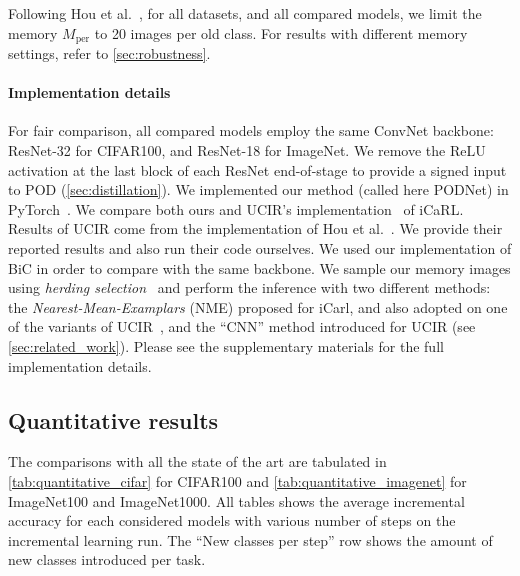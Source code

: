 Following Hou et al.~\citep{hou2019ucir}, for all datasets, and all compared models, we limit the
memory $M_\textrm{per}$ to 20 images per old class. For results with different memory settings,
refer to \autoref{sec:robustness}.

\paragraph{Implementation details} For fair comparison, all compared models employ the same ConvNet
backbone: ResNet-32 for CIFAR100, and ResNet-18 for ImageNet. We remove the ReLU activation at the
last block of each ResNet end-of-stage to provide a signed input to POD
(\autoref{sec:distillation}). We implemented our method (called here PODNet) in
PyTorch~\citep{paszke2017pytorch}.
%
We compare both ours and UCIR's implementation~\citep{hou2019ucir} of iCaRL. Results of UCIR come
from the implementation of Hou et al.~\citep{hou2019ucir}. We provide their reported results and
also run their code ourselves. We used our implementation of BiC in order to compare with the same
backbone.
%
We sample our memory images using \textit{herding selection}~\citep{rebuffi2017icarl} and perform
the inference with two different methods: the \textit{Nearest-Mean-Examplars} (NME) proposed for
iCarl, and also adopted on one of the variants of UCIR~\citep{hou2019ucir}, and the ``CNN'' method
introduced for UCIR (see \autoref{sec:related_work}).
%
Please see the supplementary materials for the full implementation details.



\subsection{Quantitative results}
\label{sec:quantitative_results}

The comparisons with all the state of the art are tabulated in \autoref{tab:quantitative_cifar} for
CIFAR100 and \autoref{tab:quantitative_imagenet} for ImageNet100 and ImageNet1000. All tables shows
the average incremental accuracy for each considered models with various number of steps on the
incremental learning run. The ``New classes per step'' row shows the amount of new classes
introduced per task.


